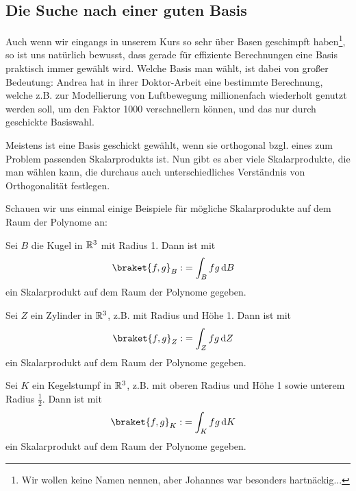 \subsection{Die Suche nach einer guten Basis}
Auch wenn wir eingangs in unserem Kurs so sehr über Basen geschimpft haben\footnote{Wir wollen keine Namen nennen, aber Johannes war besonders hartnäckig...}, so ist uns natürlich bewusst, dass gerade für effiziente Berechnungen eine Basis praktisch immer gewählt wird. Welche Basis man wählt, ist dabei von großer Bedeutung: Andrea hat in ihrer Doktor-Arbeit eine bestimmte Berechnung, welche z.B. zur Modellierung von Luftbewegung millionenfach wiederholt genutzt werden soll, um den Faktor 1000 verschnellern können, und das nur durch geschickte Basiswahl. 

\begin{remark}
	Meistens ist eine Basis geschickt gewählt, wenn sie orthogonal bzgl. eines zum Problem passenden Skalarprodukts ist. Nun gibt es aber viele Skalarprodukte, die man wählen kann, die durchaus auch unterschiedliches Verständnis von Orthogonalität festlegen.
\end{remark}
Schauen wir uns einmal einige Beispiele für mögliche Skalarprodukte auf dem Raum der Polynome an:
\begin{example}
	Sei $B$ die Kugel in $\mathbb{R}^3$ mit Radius 1. Dann ist mit
	\begin{align*}
		\braket{f,g}_B :&= \int_B f g \dd B
	\end{align*}
	ein Skalarprodukt auf dem Raum der Polynome gegeben.
\end{example}

\begin{example}
	Sei $Z$ ein Zylinder in $\mathbb{R}^3$, z.B. mit Radius und Höhe 1. Dann ist mit
	\begin{align*}
		\braket{f,g}_Z :&= \int_Z f g \dd Z
	\end{align*}
	ein Skalarprodukt auf dem Raum der Polynome gegeben.
\end{example}

\begin{example}
	Sei $K$ ein Kegelstumpf in $\mathbb{R}^3$, z.B. mit oberen Radius und Höhe 1 sowie unterem Radius $\frac{1}{2}$. Dann ist mit
	\begin{align*}
		\braket{f,g}_K :&= \int_K f g \dd K
	\end{align*}
	ein Skalarprodukt auf dem Raum der Polynome gegeben.
\end{example}

